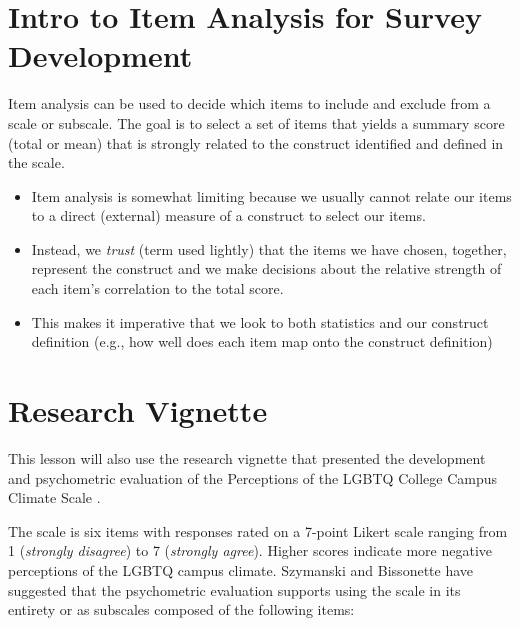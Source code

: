 \documentclass[
  english,
]{book}
\providecommand{\tightlist}{%
  \setlength{\itemsep}{0pt}\setlength{\parskip}{0pt}}
\begin{document}
\hypertarget{intro-to-item-analysis-for-survey-development}{%
\section{Intro to Item Analysis for Survey Development}\label{intro-to-item-analysis-for-survey-development}}

Item analysis can be used to decide which items to include and exclude from a scale or subscale. The goal is to select a set of items that yields a summary score (total or mean) that is strongly related to the construct identified and defined in the scale.

\begin{itemize}
\tightlist
\item
  Item analysis is somewhat limiting because we usually cannot relate our items to a direct (external) measure of a construct to select our items.
\item
  Instead, we \emph{trust} (term used lightly) that the items we have chosen, together, represent the construct and we make decisions about the relative strength of each item's correlation to the total score.
\item
  This makes it imperative that we look to both statistics and our construct definition (e.g., how well does each item map onto the construct definition)
\end{itemize}

\hypertarget{research-vignette-4}{%
\section{Research Vignette}\label{research-vignette-4}}

This lesson will also use the research vignette that presented the development and psychometric evaluation of the Perceptions of the LGBTQ College Campus Climate Scale \citep{szymanski_perceptions_2020}.

The scale is six items with responses rated on a 7-point Likert scale ranging from 1 (\emph{strongly disagree}) to 7 (\emph{strongly agree}). Higher scores indicate more negative perceptions of the LGBTQ campus climate. Szymanski and Bissonette \citeyearpar{szymanski_perceptions_2020} have suggested that the psychometric evaluation supports using the scale in its entirety or as subscales composed of the following items:
\end{document}
